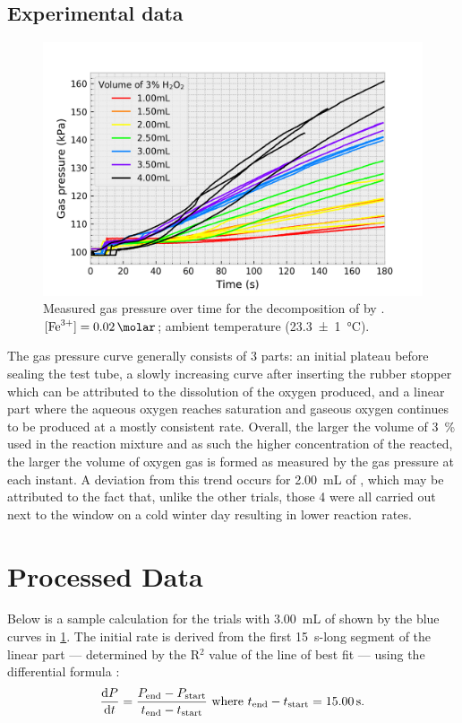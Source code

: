 \documentclass[a4paper, 12pt]{article}
\begin{document}
\subsection*{Experimental data}
\begin{figure}[H]
    \centering
    \includegraphics[width=\textwidth]{data/raw_data}
    \caption{Measured gas pressure over time for the decomposition of  by . $[\ce{Fe^{3+}}] = \SI{0.02}{\molar}$; ambient temperature (\SI{23.3(10)}{\celsius}). }
    \label{fig:raw-data}
\end{figure}

The gas pressure curve generally consists of 3 parts: an initial plateau before sealing the test tube, a slowly increasing curve after inserting the rubber stopper which can be attributed to the dissolution of the oxygen produced, and a linear part where the aqueous oxygen reaches saturation and gaseous oxygen continues to be produced at a mostly consistent rate. Overall, the larger the volume of \SI{3}{\%}   used in the reaction mixture and as such the higher concentration of the  reacted, the larger the volume of oxygen gas is formed as measured by the gas pressure at each instant. A deviation from this trend occurs for \SI{2.00}{\mL} of , which may be attributed to the fact that, unlike the other trials, those 4 were all carried out next to the window on a cold winter day resulting in lower reaction rates.

\section*{Processed Data}
Below is a sample calculation for the trials with \SI{3.00}{\mL} of  shown by the blue curves in \cref{fig:raw-data}. The initial rate is derived from the first \SI{15}{\s}-long segment of the linear part --- determined by the R$^2$ value of the line of best fit --- using the differential formula \autocite{numerical_method}:
\[ 
    \dv{P}{t} 
    = \dfrac{ P_{ \text{end} } - P_{ \text{start} } }{ t_{ \text{end} } - t_{ \text{start} } }
    \text{ where } t_{ \text{end} } - t_{ \text{start} } = \SI{15.00}{\s}. 
\]
\end{document}
